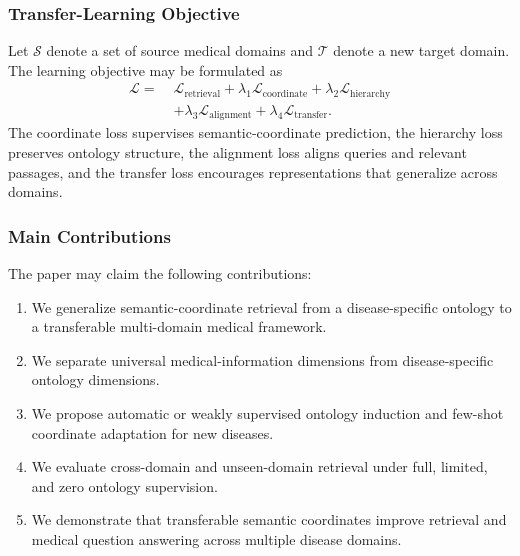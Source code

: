 \documentclass{article}
\begin{document}
\subsubsection{Transfer-Learning Objective}

Let $\mathcal{S}$ denote a set of source medical domains and $\mathcal{T}$ denote a new target domain. The learning objective may be formulated as
\begin{equation}
\begin{split}
    \mathcal{L}
    =\;&
    \mathcal{L}_{\mathrm{retrieval}}
    +
    \lambda_1 \mathcal{L}_{\mathrm{coordinate}}
    +
    \lambda_2 \mathcal{L}_{\mathrm{hierarchy}}\\
    &+
    \lambda_3 \mathcal{L}_{\mathrm{alignment}}
    +
    \lambda_4 \mathcal{L}_{\mathrm{transfer}}.
\end{split}
\end{equation}
The coordinate loss supervises semantic-coordinate prediction, the hierarchy loss preserves ontology structure, the alignment loss aligns queries and relevant passages, and the transfer loss encourages representations that generalize across domains.

\subsubsection{Main Contributions}

The paper may claim the following contributions:
\begin{enumerate}
    \item We generalize semantic-coordinate retrieval from a disease-specific ontology to a transferable multi-domain medical framework.

    \item We separate universal medical-information dimensions from disease-specific ontology dimensions.

    \item We propose automatic or weakly supervised ontology induction and few-shot coordinate adaptation for new diseases.

    \item We evaluate cross-domain and unseen-domain retrieval under full, limited, and zero ontology supervision.

    \item We demonstrate that transferable semantic coordinates improve retrieval and medical question answering across multiple disease domains.
\end{enumerate}
\end{document}
